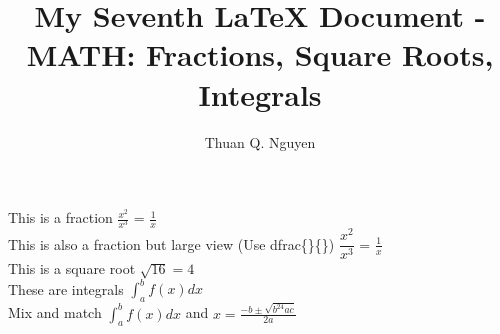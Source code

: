 \documentclass{article}
\begin{document}
\title{My Seventh \LaTeX{} Document - MATH: Fractions, Square Roots, Integrals}
\author{Thuan Q. Nguyen}
\maketitle


This is a fraction $\frac{x^2}{x^3}$ = $\frac{1}{x}$ \\
This is also a fraction but large view (Use dfrac\{\}\{\}) $\dfrac{x^2}{x^3}$ = $\frac{1}{x}$ \\

This is a square root $\sqrt{16}=4$ \\

These are integrals $\int_{a}^{b}f(x)dx$ \\

Mix and match $\int_{a}^{b}f(x)dx$ and $x=\frac{-b \pm \sqrt{b^24ac}}{2a}$
\end{document}
